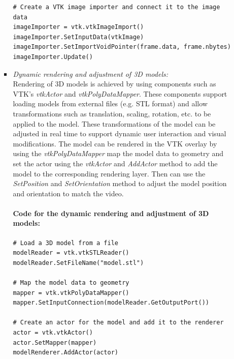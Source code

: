 \documentclass[12pt]{article}
\begin{document}
\begin{enumerate}
\begin{enumerate}
\begin{itemize}
\begin{verbatim}
# Create a VTK image importer and connect it to the image data
imageImporter = vtk.vtkImageImport()
imageImporter.SetInputData(vtkImage)
imageImporter.SetImportVoidPointer(frame.data, frame.nbytes)
imageImporter.Update()
                              \end{verbatim}
                              \item \textit{Dynamic rendering and adjustment of 3D models:}
                              \\
                              Rendering of 3D models is achieved by using components such as VTK's \emph{vtkActor} and \emph{vtkPolyDataMapper}. These components support loading models from external files (e.g. STL format) and allow transformations such as translation, scaling, rotation, etc. to be applied to the model. These transformations of the model can be adjusted in real time to support dynamic user interaction and visual modifications\cite{6037214}. The model can be rendered in the VTK overlay by using the \emph{vtkPolyDataMapper} map the model data to geometry and set the actor using the \emph{vtkActor} and \emph{AddActor} method to add the model to the corresponding rendering layer. Then can use the \emph{SetPosition} and \emph{SetOrientation} method to adjust the model position and orientation to match the video\cite{5357714}. 
                              \paragraph{Code for the dynamic rendering and adjustment of 3D models:}
                              \begin{verbatim}
# Load a 3D model from a file
modelReader = vtk.vtkSTLReader()
modelReader.SetFileName("model.stl")

# Map the model data to geometry
mapper = vtk.vtkPolyDataMapper()
mapper.SetInputConnection(modelReader.GetOutputPort())

# Create an actor for the model and add it to the renderer
actor = vtk.vtkActor()
actor.SetMapper(mapper)
modelRenderer.AddActor(actor)


\end{verbatim}
\end{itemize}
\end{enumerate}
\end{enumerate}
\end{document}
